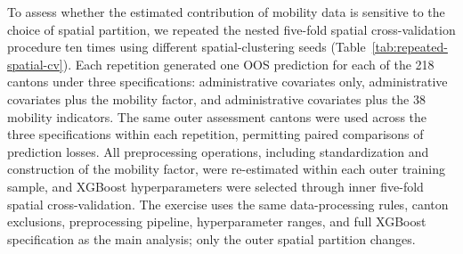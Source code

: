 \documentclass[pdflatex,sn-apa]{sn-jnl}
\begin{document}
\begin{appendices}
To assess whether the estimated contribution of mobility data is sensitive to the choice of spatial partition, we repeated the nested five-fold spatial cross-validation procedure ten times using different spatial-clustering seeds (Table~\ref{tab:repeated-spatial-cv}). Each repetition generated one OOS prediction for each of the 218 cantons under three specifications: administrative covariates only, administrative covariates plus the mobility factor, and administrative covariates plus the 38 mobility indicators. The same outer assessment cantons were used across the three specifications within each repetition, permitting paired comparisons of prediction losses. All preprocessing operations, including standardization and construction of the mobility factor, were re-estimated within each outer training sample, and XGBoost hyperparameters were selected through inner five-fold spatial cross-validation. The exercise uses the same data-processing rules, canton exclusions, preprocessing pipeline, hyperparameter ranges, and full XGBoost specification as the main analysis; only the outer spatial partition changes.

\begin{table}[!htbp]
\centering
\small
{}
\caption{Paired repeated spatial cross-validation for the full XGBoost specification. $\Delta$RMSE is augmented minus administrative-only RMSE, so negative values favor mobility. The empirical range is the 2.5th--97.5th percentile range across spatial partitions and measures sensitivity to partition choice; it is not a population-sampling confidence interval}
\label{tab:repeated-spatial-cv}
\end{table}

\end{appendices}
\end{document}
